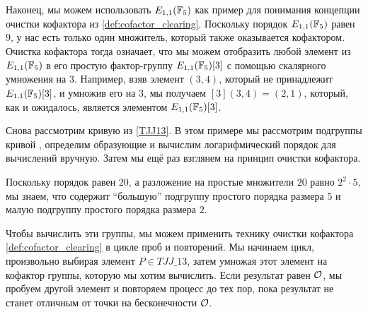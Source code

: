 \begin{example}
Наконец, мы можем использовать $E_{1,1}(\mathbb{F}_5)$ как пример для понимания концепции очистки кофактора из  {\ref{def:cofactor_clearing}}. Поскольку порядок $E_{1,1}(\mathbb{F}_5)$ равен $9$, у нас есть только один множитель, который также оказывается кофактором. Очистка кофактора тогда означает, что мы можем отобразить любой элемент из $E_{1,1}(\mathbb{F}_5)$ в его простую фактор-группу $E_{1,1}(\mathbb{F}_5)[3]$ с помощью скалярного умножения на $3$. Например, взяв элемент $(3,4)$, который не принадлежит $E_{1,1}(\mathbb{F}_5)[3]$, и умножив его на $3$, мы получаем $[3](3,4)= (2,1)$, который, как и ожидалось, является элементом $E_{1,1}(\mathbb{F}_5)[3]$.
\end{example}



\begin{example}\label{ex:TJJ13-cofactor-clearing} Снова рассмотрим кривую  \TJJ{} из \examplename{} \ref{TJJ13}. В этом примере мы рассмотрим подгруппы кривой , определим образующие и вычислим логарифмический порядок для вычислений вручную. Затем мы ещё раз взглянем на принцип очистки кофактора.

Поскольку порядок \TJJ{} равен $20$, а разложение на простые множители $20$ равно $2^2\cdot 5$, мы знаем, что \TJJ{} содержит ``большую'' подгруппу простого порядка размера $5$ и малую подгруппу простого порядка размера $2$. 

Чтобы вычислить эти группы, мы можем применить технику очистки кофактора \eqref{def:cofactor_clearing} в цикле проб и повторений. Мы начинаем цикл, произвольно выбирая элемент $P\in \mathit{TJJ\_13}$, затем умножая этот элемент на кофактор группы, которую мы хотим вычислить. Если результат равен $\mathcal{O}$, мы пробуем другой элемент и повторяем процесс до тех пор, пока результат не станет отличным от точки на бесконечности $\mathcal{O}$.  


\end{example}
